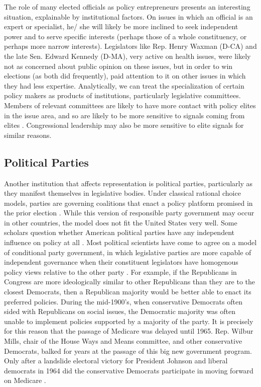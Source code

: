 The role of many elected officials as policy entrepreneurs presents an interesting situation, explainable by institutional factors. On issues in which an official is an expert or specialist, he/ she will likely be more inclined to seek independent power and to serve specific interests (perhaps those of a whole constituency, or perhaps more narrow interests). Legislators like Rep. Henry Waxman (D-CA) and the late Sen. Edward Kennedy (D-MA), very active on health issues, were likely not as concerned about public opinion on these issues, but in order to win elections (as both did frequently), paid attention to it on other issues in which they had less expertise. Analytically, we can treat the specialization of certain policy makers as products of institutions, particularly legislative committees. Members of relevant committees are likely to have more contact with policy elites in the issue area, and so are likely to be more sensitive to signals coming from elites \citep{Fenno1973}. Congressional leadership may also be more sensitive to elite signals for similar reasons.

\subsection*{Political Parties}
Another institution that affects representation is political parties, particularly as they manifest themselves in legislative bodies. Under classical rational choice models, parties are governing coalitions that enact a policy platform promised in the prior election \citep{Downs1957}. While this version of responsible party government may occur in other countries, the model does not fit the United States very well. Some scholars question whether American political parties have any independent influence on policy at all \citep{Krehbiel1993}. Most political scientists have come to agree on a model of conditional party government, in which legislative parties are more capable of independent governance when their constituent legislators have homogenous policy views relative to the other party \citep{Aldrich2011,Rohde1991}. For example, if the Republicans in Congress are more ideologically similar to other Republicans than they are to the closest Democrats, then a Republican majority would be better able to enact its preferred policies. During the mid-1900's, when conservative Democrats often sided with Republicans on social issues, the Democratic majority was often unable to implement policies supported by a majority of the party. It is precisely for this reason that the passage of Medicare was delayed until 1965. Rep. Wilbur Mills, chair of the House Ways and Means committee, and other conservative Democrats, balked for years at the passage of this big new government program. Only after a landslide electoral victory for President Johnson and liberal democrats in 1964 did the conservative Democrats participate in moving forward on Medicare \citep{Marmor1970,Starr1982}.

